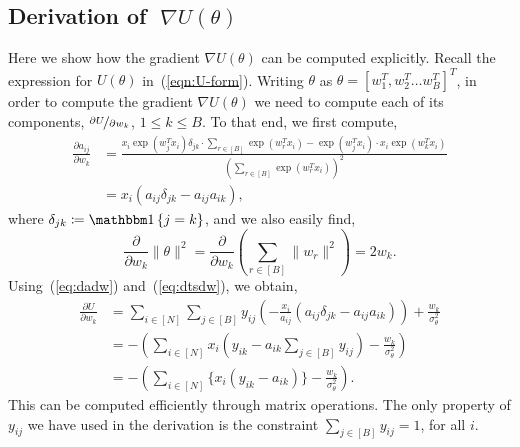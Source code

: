 \subsection{Derivation of {\boldmath $\;\nabla U(\theta)$}}
\label{appdx:gradu}
Here we show how the gradient 
$\nabla U(\theta)$ can be computed explicitly.
Recall the expression for $U(\theta)$ in~(\ref{eqn:U-form}).
Writing $\theta$ as
$\theta = \left[w_1^T, w_2^T \dots w_B^T  \right]^T$,
in order to compute the gradient
$\nabla U(\theta)$ we need to compute
each of its components,
$\nicefrac{\partial U}{\partial w_k}$,
$1\leq k\leq B$.
To that end, we first compute,
%
\begin{align}
	\frac{\partial a_{ij}}{\partial w_k} &= \frac
	{x_i \exp(w_j^T x_i) \delta_{jk} \cdot \sum_{r \in [B]} \exp(w_r^T x_i) 
		- 
		\exp(w_j^T x_i) \cdot x_i \exp(w_k^T x_i)}
	{\left( \sum_{r \in [B]} \exp(w_r^T x_i) \right)^2} \nonumber \\
	&= x_i \left( a_{ij} \delta_{jk} - a_{ij}a_{ik} \right), 
	\label{eq:dadw}
\end{align}
%
where $\delta_{jk} \coloneqq \one \left\{ j = k \right\}$,
and we also easily find,
%
\begin{equation}
	\frac{ \partial}{\partial w_k} \|\theta\|^2 = \frac{\partial}{\partial w_k} \left( \sum_{r \in [B]} \|w_r\|^2 \right) = 2w_k.
	\label{eq:dtsdw}
\end{equation}
%
Using~(\ref{eq:dadw}) and~(\ref{eq:dtsdw}), we obtain,
\begin{align}
	\frac{\partial U}{\partial w_k} &= 
	\sum_{i \in [N]} \sum_{j \in [B]} y_{ij} 
	\left( -\frac{x_i}{a_{ij}} \left( a_{ij} \delta_{jk} - a_{ij} a_{ik} \right) \right)
	+ \frac{w_k}{\sigma_\theta^2} \nonumber \\
	&=  - \left( \sum_{i \in [N]} x_i \left( y_{ik} - a_{ik} \sum_{j \in [B]} y_{ij} \right)
	- \frac{w_k}{\sigma_\theta^2} \right) \nonumber \\
	&= - \left( \sum_{i \in [N]} \Big\{ x_i (y_{ik} - a_{ik}) \Big\} - \frac{w_k}{\sigma_\theta^2} \right).
\end{align}
%
This can be computed 
efficiently through matrix operations. The only property of $y_{ij}$ 
we have used in the derivation is the constraint $\sum_{j \in [B]} y_{ij} = 1$,
for all $i$.